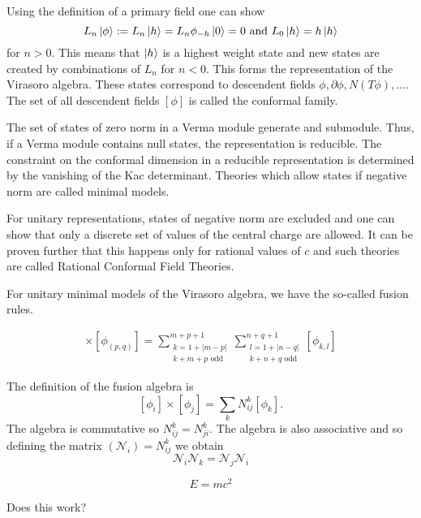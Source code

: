 \documentclass{article}
\begin{document}
Using the definition of a primary field one can show $$L_n\ket{\phi}:=L_n\ket{h}=L_n\phi_{-h}\ket{0}=0 \text{ and } L_0\ket{h}=h\ket{h}$$ for $n>0$. This means that $\ket{h}$ is a highest weight state and new states are created by combinations of $L_n$ for $n<0$. This forms the representation of the Virasoro algebra. These states correspond to descendent fields $\phi, \partial\phi, N(T\phi), \dots$. The set of all descendent fields $[\phi]$ is called the conformal family. 

The set of states of zero norm in a Verma module generate and submodule. Thus, if a Verma module contains null states, the representation is reducible. The constraint on the conformal dimension in a reducible representation is determined by the vanishing of the Kac determinant. Theories which allow states if negative norm are called minimal models. 

For unitary representations, states of negative norm are excluded and one can show that only a discrete set of values of the central charge are allowed. It can be proven further that this happens only for rational values of $c$ and such theories are called Rational Conformal Field Theories.  

For unitary minimal models of the Virasoro algebra, we have the so-called fusion rules.

\begin{align*}
    [\phi_{(m,n)}] \times [\phi_{(p,q)}]=\sum_{\substack{k=1+|m-p|\\k+m+p \text{ odd}}}^{m+p+1}\sum_{\substack{l=1+|n-q|\\k+n+q \text{ odd}}}^{n+q+1}[\phi_{k,l}]
\end{align*}

The definition of the fusion algebra is $$[\phi_i] \times [\phi_j]=\sum_kN^k_{ij}[\phi_k].$$ The algebra is commutative so $N^k_{ij}=N^k_{ji}$. The algebra is also associative and so defining the matrix $(\mathcal{N}_i)=N^k_{ij}$ we obtain $$\mathcal{N}_i\mathcal{N}_k=\mathcal{N}_j\mathcal{N}_i$$

\begin{displaymath}
	E = mc^{2}
\end{displaymath}

Does this work?
\end{document}
